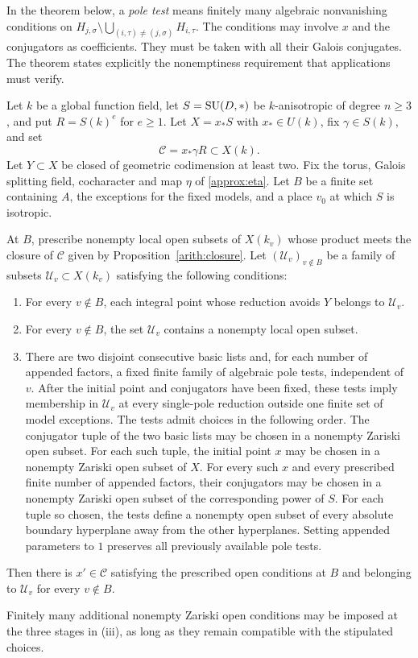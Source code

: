 In the theorem below, a \emph{pole test} means finitely many
algebraic nonvanishing conditions on
$H_{j,\sigma}\setminus\bigcup_{(i,\tau)\ne(j,\sigma)}H_{i,\tau}$.
The conditions may involve $x$ and the conjugators as
coefficients.  They must be taken with all their Galois
conjugates.  The theorem states explicitly the nonemptiness
requirement that applications must verify.

\begin{proposition}
\label{approx:power-factor}
Let $k$ be a global function field, let $S=\operatorname{SU}(D,*)$ be
$k$-anisotropic of degree $n\geq3$, and put $R=S(k)^e$ for
$e\geq1$.  Let $X=x_*S$ with $x_*\in U(k)$, fix
$\gamma\in S(k)$, and set
\[
                   \mathcal C=x_*\gamma R\subset X(k).
\]
Let $Y\subset X$ be closed of geometric codimension at least
two.  Fix the torus, Galois splitting field, cocharacter and
map $\eta$ of \eqref{approx:eta}.  Let $B$ be a finite set
containing $A$, the exceptions for the fixed models, and a
place $v_0$ at which $S$ is isotropic.

At $B$, prescribe nonempty local open subsets of $X(k_v)$
whose product meets the closure of $\mathcal C$ given by
Proposition~\ref{arith:closure}.  Let
$(\mathcal U_v)_{v\notin B}$ be a family of subsets
$\mathcal U_v\subset X(k_v)$ satisfying the following conditions:
\begin{enumerate}
\item For every $v\notin B$, each integral point whose
      reduction avoids $Y$ belongs to $\mathcal U_v$.
\item For every $v\notin B$, the set $\mathcal U_v$ contains
      a nonempty local open subset.
\item There are two disjoint consecutive basic lists and,
      for each number of appended factors, a fixed finite
      family of algebraic pole tests, independent of $v$.
      After the initial point and conjugators have been
      fixed, these tests imply membership in $\mathcal U_v$
      at every single-pole reduction outside one finite
      set of model exceptions.  The tests admit choices in
      the following order.  The conjugator tuple of the
      two basic lists may be chosen in a nonempty Zariski
      open subset.  For
      each such tuple, the initial point $x$ may be chosen
      in a nonempty Zariski open subset of $X$.  For every
      such $x$ and every prescribed finite number of
      appended factors, their conjugators may be chosen
      in a nonempty Zariski open subset of the corresponding
      power of $S$.  For each tuple so chosen, the tests
      define a nonempty open subset of every absolute
      boundary hyperplane away from the other hyperplanes.
      Setting appended parameters to $1$ preserves all
      previously available pole tests.
\end{enumerate}
Then there is $x'\in\mathcal C$ satisfying the prescribed
open conditions at $B$ and belonging to $\mathcal U_v$ for
every $v\notin B$.

Finitely many additional nonempty Zariski open conditions
may be imposed at the three stages in \textup{(iii)}, as
long as they remain compatible with the stipulated choices.
\end{proposition}

